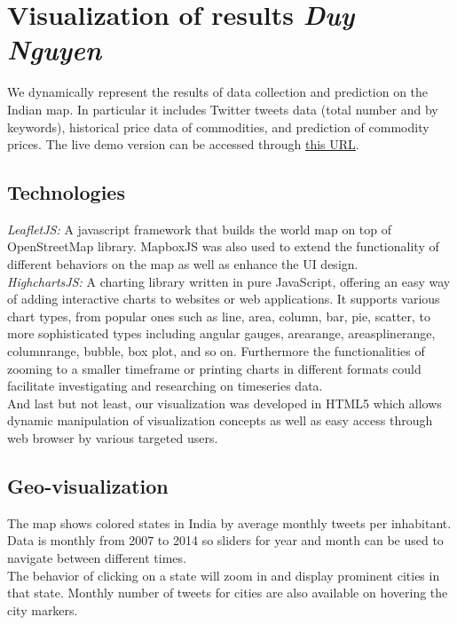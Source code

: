 \section*{Visualization of results \footnotesize\emph{Duy Nguyen}}
We dynamically represent the results of data collection and prediction on the Indian map. In particular it includes Twitter tweets data (total number and by keywords), historical price data of commodities, and prediction of commodity prices. The live demo version can be accessed through \href{http://humanitas5.azurewebsites.net/visualization/choropleth.html}{this URL}.\\

\subsection*{Technologies}
\emph{LeafletJS:} A javascript framework that builds the world map on top of OpenStreetMap library. MapboxJS was also used to extend the functionality of different behaviors on the map as well as enhance the UI design.\\
\emph{HighchartsJS:} A charting library written in pure JavaScript, offering an easy way of adding interactive charts to websites or web applications. It supports various chart types, from popular ones such as line, area, column, bar, pie, scatter, to more sophisticated types including angular gauges, arearange, areasplinerange, columnrange, bubble, box plot, and so on. Furthermore the functionalities of zooming to a smaller timeframe or printing charts in different formats could facilitate investigating and researching on timeseries data.\\
And last but not least, our visualization was developed in HTML5 which allows dynamic manipulation of visualization concepts as well as easy access through web browser by various targeted users.

\subsection*{Geo-visualization}
The map shows colored states in India by average monthly tweets per inhabitant. Data is monthly from 2007 to 2014 so sliders for year and month can be used to navigate between different times.\\
The behavior of clicking on a state will zoom in and display prominent cities in that state. Monthly number of tweets for cities are also available on hovering the city markers.


